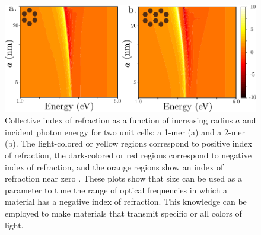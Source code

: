 \documentclass [11pt, proquest] {uwthesis}[2016/11/22]
\begin{document}
\begin{figure}
\begin{centering}
\includegraphics{contour_n_plot.pdf}
\caption{Collective index of refraction as a function of increasing radius $a$ and incident photon energy for two unit cells: a 1-mer (a) and a 2-mer (b). The light-colored or yellow regions correspond to positive index of refraction, the dark-colored or red regions correspond to negative index of refraction, and the orange regions show an index of refraction near zero \cite{enz}. These plots show that size can be used as a parameter to tune the range of optical frequencies in which a material has a negative index of refraction. This knowledge can be employed to make materials that transmit specific or all colors of light.}
\label{n_plot}
\end{centering}
\end{figure}

%
%


%
\end{document}
